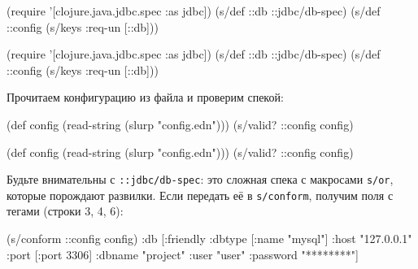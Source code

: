 \ifx\DEVICETYPE\MOBILE

\begin{english}
  \begin{clojure}
(require
  '[clojure.java.jdbc.spec :as jdbc])
(s/def ::db ::jdbc/db-spec)
(s/def ::config (s/keys :req-un [::db]))
  \end{clojure}
\end{english}

\else

\begin{english}
  \begin{clojure}
(require '[clojure.java.jdbc.spec :as jdbc])
(s/def ::db ::jdbc/db-spec)
(s/def ::config (s/keys :req-un [::db]))
  \end{clojure}
\end{english}

\fi

\noindent
Прочитаем конфигурацию из файла и проверим спекой:

\ifx\DEVICETYPE\MOBILE

\begin{english}
  \begin{clojure}
(def config
  (read-string (slurp "config.edn")))
(s/valid? ::config config)
  \end{clojure}
\end{english}

\else

\begin{english}
  \begin{clojure}
(def config (read-string (slurp "config.edn")))
(s/valid? ::config config)
  \end{clojure}
\end{english}

\fi

\label{jdbc-conform-warning}


Будьте внимательны с \verb|::jdbc/db-spec|: это сложная спека с макросами
\verb|s/or|, которые порождают развилки. Если передать её в
\verb|s/conform|, получим поля с тегами (строки 3, 4, 6):

\begin{english}
  \begin{clojure/lines}
(s/conform ::config config)
{:db
 [:friendly
  {:dbtype   [:name "mysql"]
   :host     "127.0.0.1"
   :port     [:port 3306]
   :dbname   "project"
   :user     "user"
   :password "********"}]}
  \end{clojure/lines}
\end{english}

